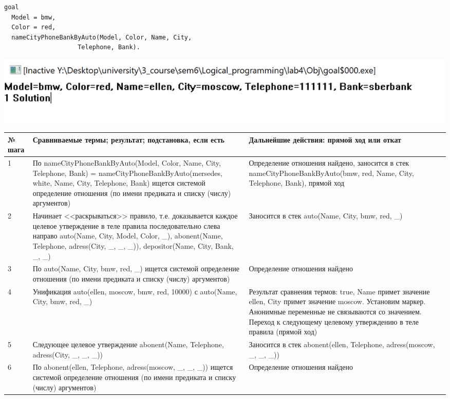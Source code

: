 \documentclass[a4paper,14pt]{extreport} %
\begin{document}
\begin{lstlisting}[caption=Пример 2. ]
goal
  Model = bmw,
  Color = red,
  nameCityPhoneBankByAuto(Model, Color, Name, City, 
					Telephone, Bank).
\end{lstlisting}

\includegraphics[scale=0.8]{ex2}

\begin{longtable}{|p{1.1cm}|p{8.5cm}|p{7cm}|}
	\hline
 	№ шага & Сравниваемые термы; результат; подстановка, если есть  & Дальнейшие действия: прямой ход или откат \\ \hline
	1 & По nameCityPhoneBankByAuto(Model, Color, Name, City, Telephone, Bank) = nameCityPhoneBankByAuto(mersedes, white, Name, City, Telephone, Bank) ищется системой определение отношения (по имени предиката и списку (числу) аргументов) & Определение отношения найдено, заносится в стек nameCityPhoneBankByAuto(bmw, red, Name, City, Telephone, Bank), прямой ход \\ \hline
	2 & Начинает <<раскрываться>> правило, т.е. доказывается каждое целевое утверждение в теле правила последовательно слева направо
	auto(Name, City, Model, Color, \_),
    abonent(Name, Telephone, adress(City, \_, \_, \_)),
    depositor(Name, City, Bank, \_, \_)
	
	& Заносится в стек auto(Name, City, bmw, red, \_) \\ \hline

	3 & По auto(Name, City, bmw, red, \_)  ищется системой определение отношения (по имени предиката и списку (числу) аргументов) & Определение отношения найдено \\ \hline
	4 & Унификация auto(ellen, moscow, bmw, red, 10000) с auto(Name, City, bmw, red, \_) & Результат сравнения термов:  true, Name примет значение ellen, City примет значение moscow. Установим маркер.  Анонимные переменные не связываются со значением. Переход к следующему целевому утверждению в теле правила (прямой ход) \\ \hline
	
	5 & Следующее целевое утверждение abonent(Name, Telephone, adress(City, \_, \_, \_)) & Заносится в стек abonent(ellen, Telephone, adress(moscow, \_, \_, \_))   \\ \hline
	6 & По abonent(ellen, Telephone, adress(moscow, \_, \_, \_))  ищется системой определение отношения (по имени предиката и списку (числу) аргументов) & Определение отношения найдено \\ \hline
	

\end{longtable}
\end{document}
